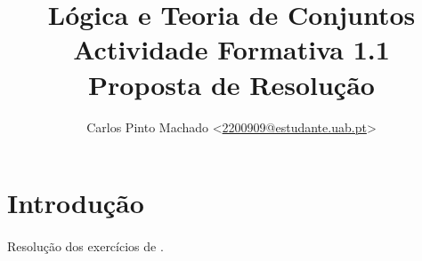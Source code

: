 \documentclass[11pt, a4paper]{article}
\title{
	Lógica e Teoria de Conjuntos\\
	Actividade Formativa 1.1\\
	Proposta de Resolução
}
\author{
	Carlos Pinto Machado
	<\href{mailto:2200909@estudante.uab.pt}{2200909@estudante.uab.pt}>
}
\begin{document}
\maketitle

\section*{Introdução}

\paragraph{} Resolução dos exercícios de \cite[secção 1.1 Linguagem]{Edmundo2021}.

\clearpage

\printbibliography[title={Bibliografia},heading=bibintoc]
\end{document}

